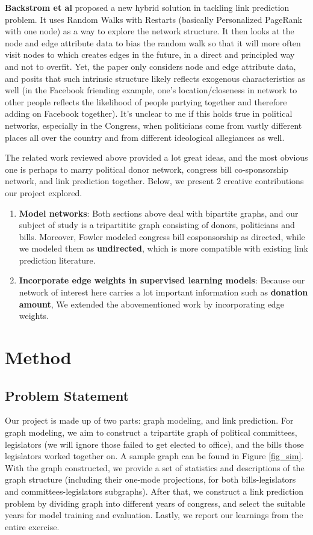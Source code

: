 \documentclass[12pt,twocolumn]{article}
\begin{document}
\textbf{Backstrom et al} \cite{backstrom2011supervised} proposed a new hybrid solution in tackling link prediction problem. It uses Random Walks with Restarts (basically Personalized PageRank with one node) as a way to explore the network structure. It then looks at the node and edge attribute data to bias the random walk so that it will more often visit nodes to which creates edges in the future, in a direct and principled way and not to overfit. Yet, the paper only considers node and edge attribute data, and posits that such intrinsic structure likely reflects exogenous characteristics as well (in the Facebook friending example, one’s location/closeness in network to other people reflects the likelihood of people partying together and therefore adding on Facebook together). It’s unclear to me if this holds true in political networks, especially in the Congress, when politicians come from vastly different places all over the country and from different ideological allegiances as well.

The related work reviewed above provided a lot great ideas, and the most obvious one is perhaps to marry political donor network, congress bill co-sponsorship network, and link prediction together. Below, we present 2 creative contributions our project explored. 
\begin{enumerate}
\item \textbf{Model networks}: Both sections above deal with bipartite graphs, and our subject of study is a tripartitite graph consisting of donors, politicians and bills. Moreover, Fowler \cite{fowler2006connecting} modeled congress bill cosponsorship as directed, while we modeled them as \textbf{undirected}, which is more compatible with existing link prediction literature. 
\item \textbf{Incorporate edge weights in supervised learning models}: Because our network of interest here carries a lot important information such as \textbf{donation amount}, We extended the abovementioned work by incorporating edge weights.  
\end{enumerate}

\section{Method}
\subsection{Problem Statement}
Our project is made up of two parts: graph modeling, and link prediction. For graph modeling, we aim to construct a tripartite graph of political committees, legislators (we will ignore those failed to get elected to office), and the bills those legislators worked together on. A sample graph can be found in Figure \ref{fig_sim}. With the graph constructed, we provide a set of statistics and descriptions of the graph structure (including their one-mode projections, for both bills-legislators and committees-legislators subgraphs). After that, we construct a link prediction problem by dividing graph into different years of congress, and select the suitable years for model training and evaluation. Lastly, we report our learnings from the entire exercise. 
\end{document}
